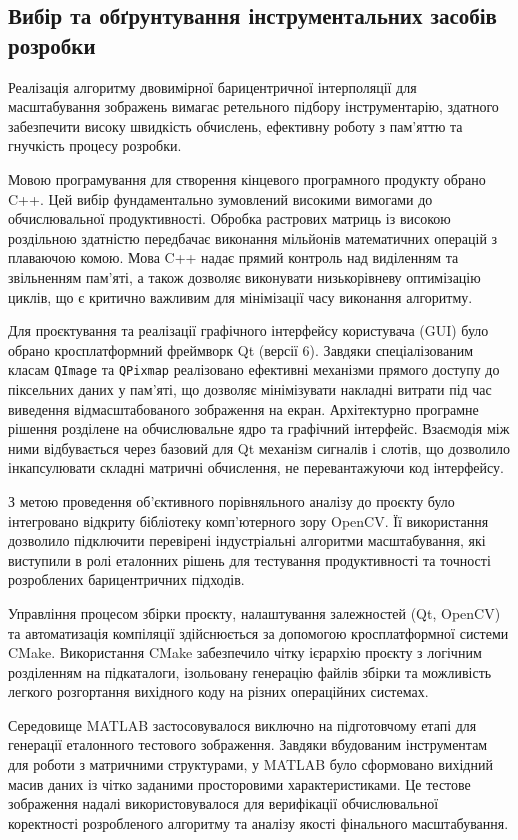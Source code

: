 \subsection{Вибір та обґрунтування інструментальних засобів розробки}

Реалізація алгоритму двовимірної барицентричної інтерполяції для масштабування зображень вимагає ретельного підбору інструментарію, здатного забезпечити високу швидкість обчислень, ефективну роботу з пам'яттю та гнучкість процесу розробки.

Мовою програмування для створення кінцевого програмного продукту обрано C++. Цей вибір фундаментально зумовлений високими вимогами до обчислювальної продуктивності. Обробка растрових матриць із високою роздільною здатністю передбачає виконання мільйонів математичних операцій з плаваючою комою. Мова C++ надає прямий контроль над виділенням та звільненням пам'яті, а також дозволяє виконувати низькорівневу оптимізацію циклів, що є критично важливим для мінімізації часу виконання алгоритму.

Для проєктування та реалізації графічного інтерфейсу користувача (GUI) було обрано кросплатформний фреймворк Qt (версії 6). Завдяки спеціалізованим класам \texttt{QImage} та \texttt{QPixmap} реалізовано ефективні механізми прямого доступу до піксельних даних у пам'яті, що дозволяє мінімізувати накладні витрати під час виведення відмасштабованого зображення на екран. Архітектурно програмне рішення розділене на обчислювальне ядро та графічний інтерфейс. Взаємодія між ними відбувається через базовий для Qt механізм сигналів і слотів, що дозволило інкапсулювати складні матричні обчислення, не перевантажуючи код інтерфейсу.

З метою проведення об'єктивного порівняльного аналізу до проєкту було інтегровано відкриту бібліотеку комп'ютерного зору OpenCV. Її використання дозволило підключити перевірені індустріальні алгоритми масштабування, які виступили в ролі еталонних рішень для тестування продуктивності та точності розроблених барицентричних підходів.

Управління процесом збірки проєкту, налаштування залежностей (Qt, OpenCV) та автоматизація компіляції здійснюється за допомогою кросплатформної системи CMake. Використання CMake забезпечило чітку ієрархію проєкту з логічним розділенням на підкаталоги, ізольовану генерацію файлів збірки та можливість легкого розгортання вихідного коду на різних операційних системах.

Середовище MATLAB застосовувалося виключно на підготовчому етапі для генерації еталонного тестового зображення. Завдяки вбудованим інструментам для роботи з матричними структурами, у MATLAB було сформовано вихідний масив даних із чітко заданими просторовими характеристиками. Це тестове зображення надалі використовувалося для верифікації обчислювальної коректності розробленого алгоритму та аналізу якості фінального масштабування.